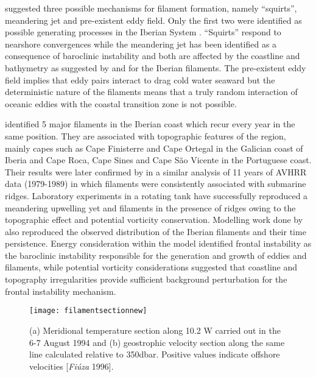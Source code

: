 \citet{Strub91} suggested three possible mechanisms for filament
formation, namely ``squirts'', meandering jet and pre-existent
eddy field. Only the  first two were identified as possible
generating processes in the Iberian System \citep{Haynes93}.
``Squirts'' respond to nearshore convergences while the meandering
jet has been identified as a consequence of baroclinic instability
and both are affected by the coastline and bathymetry as suggested
by \citet{Sousa92} and \citet{Haynes93} for the Iberian filaments.
The pre-existent eddy field implies that eddy pairs interact to
drag cold water seaward but the deterministic nature of the
filaments means that a truly random interaction of oceanic eddies
with the coastal transition zone is not possible.

\citet{Haynes93} identified 5 major filaments in the Iberian coast
which recur every year in the same position. They are associated
with topographic features of the region, mainly capes such as Cape
Finisterre and Cape Ortegal in the Galician coast of Iberia and
Cape Roca, Cape Sines and Cape S\~ao Vicente in the Portuguese
coast. Their results were later confirmed by \citet{Sousa95} in a
similar analysis of 11 years of AVHRR data (1979-1989) in which
filaments were consistently associated with submarine ridges.
Laboratory experiments in a rotating tank \citep{Narimousa89} have
successfully reproduced a meandering upwelling yet and filaments
in the presence of ridges owing to the topographic effect and
potential vorticity conservation. Modelling work done by
\citet{Roed96} also reproduced the observed distribution of the
Iberian filaments and their time persistence. Energy consideration
within the model identified frontal instability as the baroclinic
instability responsible for the generation and growth of eddies
and filaments, while potential vorticity considerations suggested
that coastline and topography irregularities provide sufficient
background perturbation for the frontal instability mechanism.
\begin{figure}
  \centering
  \texttt{[image: filamentsectionnew]}
  \caption{(a) Meridional temperature section along 10.2 W carried
  out in the 6-7 August 1994 and (b) geostrophic velocity section
  along the same line calculated relative to 350dbar. Positive
  values indicate offshore velocities [{\it Fi\'uza }1996].}
  \label{fig:morenafil}
\end{figure}

